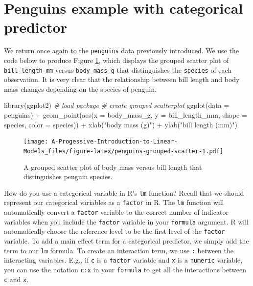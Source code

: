 \documentclass[
]{book}
\newenvironment{Shaded}{\begin{snugshade}}{\end{snugshade}}
\newcommand{\AttributeTok}[1]{\textcolor[rgb]{0.77,0.63,0.00}{#1}}
\newcommand{\CommentTok}[1]{\textcolor[rgb]{0.56,0.35,0.01}{\textit{#1}}}
\newcommand{\FunctionTok}[1]{\textcolor[rgb]{0.00,0.00,0.00}{#1}}
\newcommand{\NormalTok}[1]{#1}
\newcommand{\SpecialCharTok}[1]{\textcolor[rgb]{0.00,0.00,0.00}{#1}}
\newcommand{\StringTok}[1]{\textcolor[rgb]{0.31,0.60,0.02}{#1}}
\theoremstyle{definition}
\theoremstyle{definition}
\theoremstyle{definition}
\theoremstyle{definition}
\theoremstyle{remark}
\begin{document}
\hypertarget{s:penguins-mlr2}{%
\section{Penguins example with categorical predictor}\label{s:penguins-mlr2}}

We return once again to the \texttt{penguins} data previously introduced. We use the code below to produce Figure \ref{fig:penguins-grouped-scatter}, which displays the grouped scatter plot of \texttt{bill\_length\_mm} versus \texttt{body\_mass\_g} that distinguishes the \texttt{species} of each observation. It is very clear that the relationship between bill length and body mass changes depending on the species of penguin.

\begin{Shaded}
\begin{Highlighting}[]
\FunctionTok{library}\NormalTok{(ggplot2) }\CommentTok{\# load package}
\CommentTok{\# create grouped scatterplot}
\FunctionTok{ggplot}\NormalTok{(}\AttributeTok{data =}\NormalTok{ penguins) }\SpecialCharTok{+}
  \FunctionTok{geom\_point}\NormalTok{(}\FunctionTok{aes}\NormalTok{(}\AttributeTok{x =}\NormalTok{ body\_mass\_g, }\AttributeTok{y =}\NormalTok{ bill\_length\_mm, }\AttributeTok{shape =}\NormalTok{ species, }\AttributeTok{color =}\NormalTok{ species)) }\SpecialCharTok{+}
  \FunctionTok{xlab}\NormalTok{(}\StringTok{"body mass (g)"}\NormalTok{) }\SpecialCharTok{+} \FunctionTok{ylab}\NormalTok{(}\StringTok{"bill length (mm)"}\NormalTok{)}
\end{Highlighting}
\end{Shaded}

\begin{figure}
\centering
\texttt{[image: A-Progessive-Introduction-to-Linear-Models\_files/figure-latex/penguins-grouped-scatter-1.pdf]}
\caption{\label{fig:penguins-grouped-scatter}A grouped scatter plot of body mass versus bill length that distinguishes penguin species.}
\end{figure}

How do you use a categorical variable in R's \texttt{lm} function? Recall that we should represent our categorical variables as a \texttt{factor} in R. The \texttt{lm} function will automatically convert a \texttt{factor} variable to the correct number of indicator variables when you include the \texttt{factor} variable in your \texttt{formula} argument. R will automatically choose the reference level to be the first level of the \texttt{factor} variable. To add a main effect term for a categorical predictor, we simply add the term to our \texttt{lm} formula. To create an interaction term, we use \texttt{:} between the interacting variables. E.g., if \texttt{c} is a \texttt{factor} variable and \texttt{x} is a \texttt{numeric} variable, you can use the notation \texttt{c:x} in your \texttt{formula} to get all the interactions between \texttt{c} and \texttt{x}.
\end{document}

